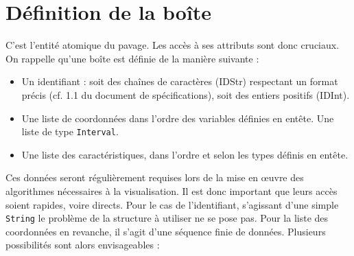 \section{Définition de la boîte}
C'est l'entité atomique du pavage. Les accès à ses attributs sont donc cruciaux. On rappelle qu'une boîte est définie de la manière suivante : 
\begin{itemize}
\item 
  Un identifiant : soit des chaînes de caractères (IDStr) respectant un format précis (cf. 1.1 du document de spécifications), soit des entiers positifs (IDInt).
\item
  Une liste de coordonnées dans l'ordre des variables définies en entête. Une liste de type \verb+Interval+.
\item
  Une liste des caractéristiques, dans l'ordre et selon les types définis en entête.
\end{itemize}
Ces données seront régulièrement requises lors de la mise en œuvre des algorithmes nécessaires à la visualisation. Il est donc important que leurs accès soient rapides, voire directs. Pour le cas de l'identifiant, s'agissant d'une simple \verb+String+ le problème de la structure à utiliser ne se pose pas. Pour la liste des coordonnées en revanche, il s'agit d'une séquence finie de données. Plusieurs possibilités sont alors envisageables : 

